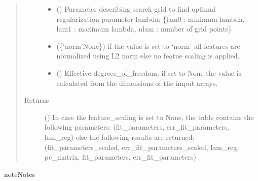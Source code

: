 \documentclass[a4paper,10pt,english]{sphinxmanual}
\begin{document}
\begin{fulllineitems}
\begin{quote}
\begin{description}
\begin{itemize}
\item {} 
 () \textendash{} Parameter describing search grid to find optimal regularization
parameter lambda: \{lam0 : minimum lambda, lam1 : maximum lambda,
nlam : number of grid points\}

\item {} 
 (\{‘norm’{\color{red}\bfseries{}\textbar{}}None\}) \textendash{} if the value is set to ‘norm’ all features are normalized using L2
norm else no featue scaling is applied.

\item {} 
 () \textendash{} Effective  degrees\_of\_freedom, if set to None the value is calculated
from the dimensions of the imput arrays.

\end{itemize}

\item[{Returns}] \leavevmode
{} () \textendash{} In case the feature\_scaling is set to None, the tuble contains the
following parameters: (fit\_parameters, err\_fit\_parameters, lam\_reg)
else the following results are returned: (fit\_parameters\_scaled,
err\_fit\_parameters\_scaled, lam\_reg, pc\_matrix, fit\_parameters,
err\_fit\_parameters)

\end{description}\end{quote}

\begin{sphinxadmonition}{note}{Notes}


\end{sphinxadmonition}
\end{fulllineitems}
\end{document}
